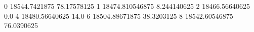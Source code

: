 0 18544.7421875 78.17578125
1 18474.810546875 8.244140625
2 18466.56640625 0.0
4 18480.56640625 14.0
6 18504.88671875 38.3203125
8 18542.60546875 76.0390625
